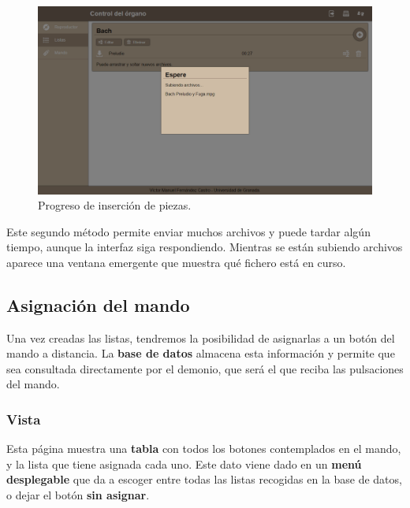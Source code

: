 \smallskip

\begin{figure}[H]
	\noindent \begin{centering}
		\includegraphics[width=\linewidth*2/3]{capitulo5/cap_ins_pieza}
		\par\end{centering}
	\smallskip
	\caption{\label{fig:cap_ins_pieza} Progreso de inserción de piezas.}
\end{figure} 

\smallskip

Este segundo método permite enviar muchos archivos y puede tardar algún tiempo, aunque la interfaz siga respondiendo. Mientras se están subiendo archivos aparece una ventana emergente que muestra qué fichero está en curso.

\subsection{Asignación del mando}

Una vez creadas las listas, tendremos la posibilidad de asignarlas a un botón del mando a distancia. La \textbf{base de datos} almacena esta información y permite que sea consultada directamente por el demonio, que será el que reciba las pulsaciones del mando.

\subsubsection{Vista}

Esta página muestra una \textbf{tabla} con todos los botones contemplados en el mando, y la lista que tiene asignada cada uno. Este dato viene dado en un \textbf{menú desplegable} que da a escoger entre todas las listas recogidas en la base de datos, o dejar el botón \textbf{sin asignar}.

